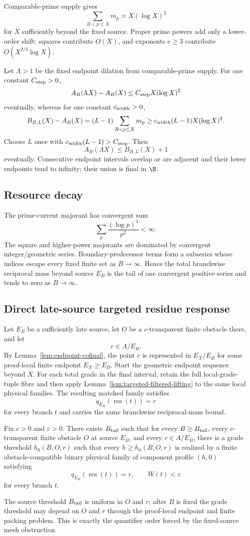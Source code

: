 Comparable-prime supply gives
\[
\sum_{B<p\le X}m_p\asymp X(\log X)^2
\tag{T13}\label{eq:mp-sum}
\]
for $X$ sufficiently beyond the fixed source.  Proper prime powers add only a
lower-order shift: squares contribute $O(X)$, and exponents $e\ge3$ contribute
$O(X^{2/3}\log X)$.

Let $\Lambda>1$ be the fixed endpoint dilation from comparable-prime supply.
For one constant $C_{\rm step}>0$,
\[
A_B(\Lambda X)-A_B(X)
\le C_{\rm step}X(\log X)^2
\]
eventually, whereas for one constant $c_{\rm width}>0$,
\[
B_{B,L}(X)-A_B(X)
=(L-1)\sum_{B<p\le X}m_p
\ge c_{\rm width}(L-1)X(\log X)^2.
\]
Choose $L$ once with
$c_{\rm width}(L-1)>C_{\rm step}$.  Then
\[
A_B(\Lambda X)\le B_{B,L}(X)+1
\tag{T14}\label{eq:r14-overlap}
\]
eventually.  Consecutive endpoint intervals overlap or are adjacent and their
lower endpoints tend to infinity; their union is final in $\N$.

\subsection{Resource decay}

The prime-current majorant has convergent sum
\[
\sum_p\frac{(\log p)^4}{p^2}<\infty.
\]
The square and higher-power majorants are dominated by convergent
integer/geometric series.  Boundary-predecessor terms form a subseries whose
indices escape every fixed finite set as $B\to\infty$.  Hence the total
branchwise reciprocal mass beyond source $E_B$ is the tail of one convergent
positive series and tends to zero as $B\to\infty$.

\subsection{Direct late-source targeted residue response}

Let $E_B$ be a sufficiently late source, let $O$ be a $c$-transparent finite
obstacle there, and let
\[
r\in A/E_B.
\]
By Lemma~\ref{lem:endpoint-cofinal}, the point $r$ is represented in
$E_X/E_B$ for some proof-local finite endpoint $E_X\ge E_B$.  Start the
geometric endpoint sequence beyond $X$.  For each total grade in the final
interval, retain the full local-grade-tuple fibre and then apply
Lemma~\ref{lem:targeted-filtered-lifting} to the same local physical families.
The resulting matched family satisfies
\[
q_{E_B}(\operatorname{res}(t))=r
\]
for every branch $t$ and carries the same branchwise reciprocal-mass bound.

\begin{theorem}\label{thm:ltar-closed}
Fix $c>0$ and $\varepsilon>0$.  There exists $B_{\rm tail}$ such that for
every $B\ge B_{\rm tail}$, every $c$-transparent finite obstacle $O$ at source
$E_B$, and every $r\in A/E_B$, there is a grade threshold $h_0(B,O,r)$ such
that every $h\ge h_0(B,O,r)$ is realized by a finite obstacle-compatible
binary physical family of component profile $(h,0)$ satisfying
\[
q_{E_B}(\operatorname{res}(t))=r,
\qquad
W(t)<\varepsilon
\]
for every branch $t$.
\end{theorem}

The source threshold $B_{\rm tail}$ is uniform in $O$ and $r$; after $B$ is
fixed the grade threshold may depend on $O$ and $r$ through the proof-local
endpoint and finite packing problem.  This is exactly the quantifier order
forced by the fixed-source mesh obstruction.
